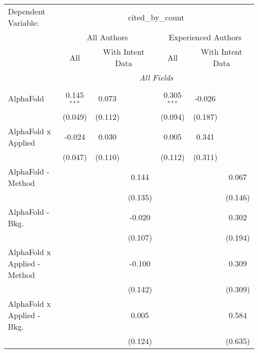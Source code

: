 \begingroup
\centering
\begin{tabular}{lcccccc}
   \tabularnewline \midrule \midrule
   Dependent Variable: & \multicolumn{6}{c}{cited\_by\_count}\\
 & \multicolumn{3}{c}{All Authors} & \multicolumn{3}{c}{Experienced Authors} \\
\cmidrule(lr){2-4} \cmidrule(lr){5-7}
 & \multicolumn{1}{c}{All} & \multicolumn{2}{c}{With Intent Data} & \multicolumn{1}{c}{All} & \multicolumn{2}{c}{With Intent Data} \\
\cmidrule(lr){2-2} \cmidrule(lr){3-4} \cmidrule(lr){5-5} \cmidrule(lr){6-7}
 & \multicolumn{6}{c}{\textit{All Fields}} \\ \\
   AlphaFold                      & 0.145$^{***}$ & 0.073   &         & 0.305$^{***}$ & -0.026        &   \\   
                                  & (0.049)       & (0.112) &         & (0.094)       & (0.187)       &   \\   
   AlphaFold x Applied            & -0.024        & 0.030   &         & 0.005         & 0.341         &   \\   
                                  & (0.047)       & (0.110) &         & (0.112)       & (0.311)       &   \\   
   AlphaFold - Method             &               &         & 0.144   &               &               & 0.067\\   
                                  &               &         & (0.135) &               &               & (0.146)\\   
   AlphaFold - Bkg.               &               &         & -0.020  &               &               & 0.302\\   
                                  &               &         & (0.107) &               &               & (0.194)\\   
   AlphaFold x Applied - Method   &               &         & -0.100  &               &               & 0.309\\   
                                  &               &         & (0.142) &               &               & (0.309)\\   
   AlphaFold x Applied - Bkg.     &               &         & 0.005   &               &               & 0.584\\   
                                  &               &         & (0.124) &               &               & (0.635)\\   

\end{tabular}
